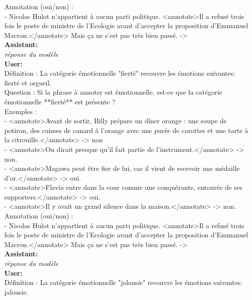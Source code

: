 {Annotation (oui/non) :\\
- Nicolas Hulot n’appartient à aucun parti politique. <annotate>Il a refusé trois fois le poste de ministre de l’Ecologie avant d’accepter la proposition d’Emmanuel Macron.</annotate> Mais ça ne s’est pas très bien passé.  -> \\

\textbf{Assistant:}\\
\textit{réponse du modèle}\\

\textbf{User:}\\
Définition : La catégorie émotionnelle "fierté" recouvre les émotions suivantes: fierté et orgueil.\\

Question : Si la phrase à annoter est émotionnelle, est-ce que la catégorie émotionnelle **fierté** est présente ?\\

Exemples :\\
- <annotate>Avant de sortir, Billy prépare un dîner orange : une soupe de potiron, des cuisses de canard à l'orange avec une purée de carottes et une tarte à la citrouille.</annotate> -> non\\
- <annotate>On dirait presque qu'il fait partie de l'instrument.</annotate> -> non.\\
- <annotate>Magawa peut être fier de lui, car il vient de recevoir une médaille d'or.</annotate> -> oui.\\
- <annotate>Flavia entre dans la cour comme une conquérante, entourée de ses supporters.</annotate> -> oui.\\
- <annotate>Il y avait un grand silence dans la maison.</annotate> -> non.\\

Annotation (oui/non) :\\
- Nicolas Hulot n’appartient à aucun parti politique. <annotate>Il a refusé trois fois le poste de ministre de l’Ecologie avant d’accepter la proposition d’Emmanuel Macron.</annotate> Mais ça ne s’est pas très bien passé.  -> \\

\textbf{Assistant:}\\
\textit{réponse du modèle}\\

\textbf{User:}\\
Définition : La catégorie émotionnelle "jalousie" recouvre les émotions suivantes: jalousie.\\

}
